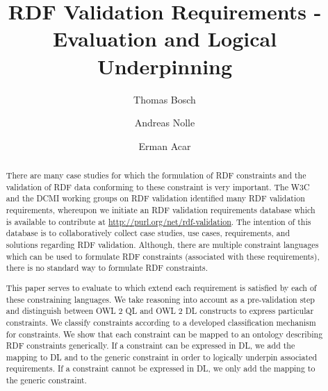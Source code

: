 \documentclass{llncs}
\begin{document}
%
%
\title{RDF Validation Requirements - Evaluation and Logical Underpinning}
\subtitle{}
%
%
\author{Thomas Bosch \and Andreas Nolle \and Erman Acar}
%
%

\maketitle              %

\begin{abstract}
There are many case studies for which the formulation of RDF constraints and the validation of RDF data conforming to these constraint is very important.  
The W3C and the DCMI working groups on RDF validation identified many RDF validation requirements,
whereupon we initiate an RDF validation requirements database which is available to contribute at \url{http://purl.org/net/rdf-validation}.
The intention of this database is to collaboratively collect case studies, use cases, requirements, and solutions regarding RDF validation.
Although, there are multiple constraint languages which can be used to formulate RDF constraints (associated with these requirements), 
there is no standard way to formulate RDF constraints.

This paper serves to evaluate to which extend each requirement is satisfied by each of these constraining languages.
We take reasoning into account as a pre-validation step and distinguish between OWL 2 QL and OWL 2 DL constructs to express particular constraints.
We classify constraints according to a developed classification mechanism for constraints.
We show that each constraint can be mapped to an ontology describing RDF constraints generically.
If a constraint can be expressed in DL, we add the mapping to DL and to the generic constraint in order to logically underpin associated requirements.
If a constraint cannot be expressed in DL, we only add the mapping to the generic constraint.

\end{abstract}
%
\end{document}
